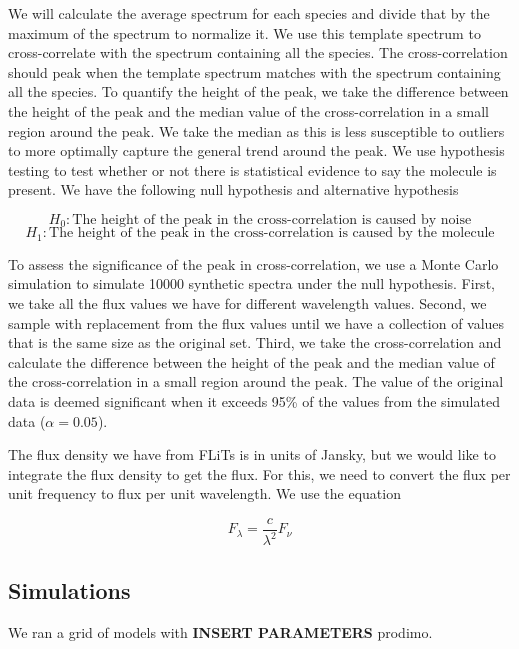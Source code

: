 \documentclass[twoside,single, authoryear, semicolon]{lion-msc}
\begin{document}
We will calculate the average spectrum for each species and divide that by the maximum of the spectrum to normalize it. We use this template spectrum to cross-correlate with the spectrum containing all the species. The cross-correlation should peak when the template spectrum matches with the spectrum containing all the species. To quantify the height of the peak, we take the difference between the height of the peak and the median value of the cross-correlation in a small region around the peak. We take the median as this is less susceptible to outliers to more optimally capture the general trend around the peak. We use hypothesis testing to test whether or not there is statistical evidence to say the molecule is present. We have the following null hypothesis and alternative hypothesis

\begin{equation}
    H_0: \text{The height of the peak in the cross-correlation is caused by noise}
\end{equation}
\begin{equation}
    H_1: \text{The height of the peak in the cross-correlation is caused by the molecule}
\end{equation}

To assess the significance of the peak in cross-correlation, we use a Monte Carlo simulation to simulate 10000 synthetic spectra under the null hypothesis. First, we take all the flux values we have for different wavelength values. Second, we sample with replacement from the flux values until we have a collection of values that is the same size as the original set. Third, we take the cross-correlation and calculate the difference between the height of the peak and the median value of the cross-correlation in a small region around the peak. The value of the original data is deemed significant when it exceeds 95\% of the values from the simulated data ($\alpha=0.05$).


The flux density we have from FLiTs is in units of Jansky, but we would like to integrate the flux density to get the flux. For this, we need to convert the flux per unit frequency to flux per unit wavelength. We use the equation

\begin{equation}
    F_\lambda=\frac{c}{\lambda^2}F_\nu
\end{equation}




\subsection{Simulations}
We ran a grid of models with \textbf{INSERT PARAMETERS} prodimo. 
\end{document}
